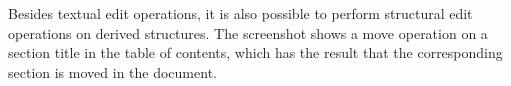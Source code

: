 \documentclass{entcs}
\begin{document}
Besides textual edit operations, it is also possible to perform structural edit operations on derived structures. The screenshot shows a move operation on a section title in the table of contents, which has the result that the corresponding section is moved in the document.


\newcommand{\editScreenshotTrnsFr}[3]{%
%
\begin{center}
\begin{picture}(340,135)(0,0)
\begin{scriptsize}
\put(2,30){ \makebox(160,105){#1}}
\put(2,30){ \epsfig{file=pics/eps/frame.eps, height=105pt} }
\put(180,30){ \makebox(160,105){#2}}
\put(180,30){ \epsfig{file=pics/eps/frame.eps, height=105pt} }
\end{scriptsize}
\put(165,80){ $\Rightarrow$}
\put(96,0) { \makebox(150,30){#3}}
\end{picture}
\end{center}
}
\end{document}
